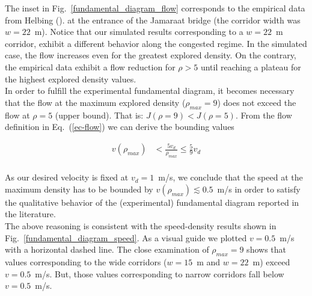 The inset in Fig.~\ref{fundamental_diagram_flow} corresponds to the empirical data from Helbing (\cite{helbing3}). at the entrance of the Jamaraat bridge (the corridor width was $w=22$~m). Notice that our simulated results corresponding to a $w=22$~m corridor, exhibit a different behavior along the congested regime. In the simulated case, the flow increases even for the greatest explored density. On the contrary, the empirical data exhibit a flow reduction for $\rho > 5$ until reaching a plateau for the highest explored density values.  \\

In order to fulfill the experimental fundamental diagram, it becomes necessary that the flow at the maximum explored density ($\rho_{max} = 9$) does not exceed the flow at $\rho = 5$ (upper bound). That is:  $J(\rho = 9) < J(\rho = 5)$. From the flow definition in Eq.~(\ref{ec-flow}) we can derive the bounding values

\begin{align*} 
v(\rho_{max}) &< \frac{5v_d}{\rho_{max}} \leq \frac{5}{9} v_d \\
\end{align*}

As our desired velocity is fixed at $v_d = 1$~m/s, we conclude that the speed at the maximum density has to be bounded by $v(\rho_{max}) \lesssim  0.5$~m/s in order to satisfy the qualitative behavior of the (experimental) fundamental diagram reported in the literature.\\

The above reasoning is consistent with the speed-density results shown in Fig.~\ref{fundamental_diagram_speed}. As a visual guide we plotted $v=0.5$~m/s with a horizontal dashed line. The close examination of $\rho_{max} = 9$ shows that values corresponding to the wide corridors ($w=15$~m and $w=22$~m) exceed $v=0.5$~m/s. But, those values corresponding to narrow corridors fall below $v=0.5$~m/s. \\

